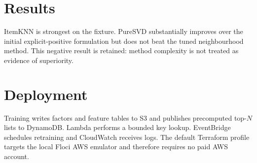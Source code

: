 \section{Results}
\begin{table}[h]
\centering\scriptsize
\caption{Global temporal test results on the reproducible fixture.}

\end{table}
ItemKNN is strongest on the fixture. PureSVD substantially improves over the
initial explicit-positive formulation but does not beat the tuned
neighbourhood method. This negative result is retained: method complexity is
not treated as evidence of superiority.

\section{Deployment}
Training writes factors and feature tables to S3 and publishes precomputed
top-$N$ lists to DynamoDB. Lambda performs a bounded key lookup. EventBridge
schedules retraining and CloudWatch receives logs. The default Terraform
profile targets the local Floci AWS emulator and therefore requires no paid AWS account.
